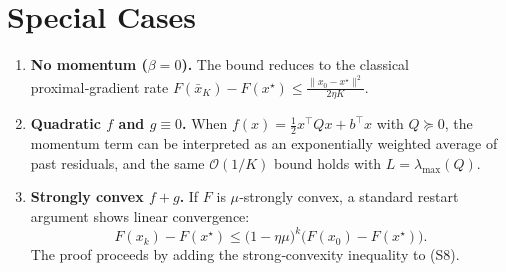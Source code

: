\documentclass{article}
\begin{document}
\section*{Special Cases}
\begin{enumerate}[leftmargin=*]
\item \textbf{No momentum ($\beta=0$).}  The bound reduces to the classical proximal‑gradient
rate $F(\bar{x}_K)-F(x^\star)\le \frac{\|x_0-x^\star\|^{2}}{2\eta K}$.
\item \textbf{Quadratic $f$ and $g\equiv0$.}  When $f(x)=\frac{1}{2}x^\top Qx+b^\top x$ with $Q\succeq0$,
the momentum term can be interpreted as an exponentially weighted average of past residuals,
and the same $\mathcal O(1/K)$ bound holds with $L=\lambda_{\max}(Q)$.
\item \textbf{Strongly convex $f+g$.}  If $F$ is $\mu$‑strongly convex, a standard
restart argument shows linear convergence:
\[
F(x_k)-F(x^\star)\le \bigl(1-\eta\mu\bigr)^k\bigl(F(x_0)-F(x^\star)\bigr).
\]
The proof proceeds by adding the strong‑convexity inequality to (S8).
\end{enumerate}
\end{document}
